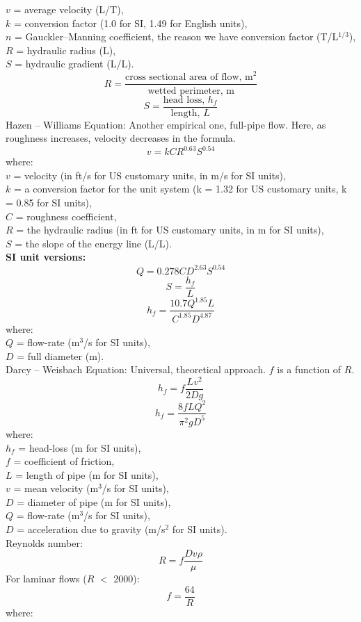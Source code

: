 \documentclass{article}
\numberwithin{equation}{section}
\begin{document}
$v$ = average velocity (L/T),\\
$k$ = conversion factor (1.0 for SI, 1.49 for English units),\\
$n$ = Gauckler–Manning coefficient, the reason we have conversion factor (T/L$^{1/3}$),\\
$R$ = hydraulic radius (L),\\
$S$ = hydraulic gradient (L/L).
\[
R = \frac{\text{cross sectional area of flow, m}^2}{\text{wetted perimeter, m}}
\]
\[
S = \frac{\text{head loss, }h_f}{\text{length, }L}
\]
Hazen -- Williams Equation: Another empirical one, full-pipe flow. Here, as roughness increases, velocity decreases in the formula.
\[
v = kCR^{0.63}S^{0.54}
\]
where:\\
$v$ = velocity (in ft/s for US customary units, in m/s for SI units),\\
$k$ = a conversion factor for the unit system (k = 1.32 for US customary units, k = 0.85 for SI units),\\
$C$ = roughness coefficient,\\
$R$ = the hydraulic radius (in ft for US customary units, in m for SI units),\\
$S$ = the slope of the energy line (L/L).\\
\textbf{SI unit versions:} %
\[
Q = 0.278CD^{2.63}S^{0.54}
\]
\[
S = \frac{h_f}{L}
\]
\[
h_f = \frac{10.7Q^{1.85}L}{C^{1.85}D^{4.87}}
\]
where:\\
$Q$ = flow-rate (m$^3$/s for SI units),\\
$D$ = full diameter (m).\\
Darcy -- Weisbach Equation: Universal, theoretical approach. $f$ is a function of $R$.
\[
h_f = f\frac{Lv^2}{2Dg}
\]
\[
h_f = \frac{8fLQ^2}{\pi^2gD^5}
\]
where:\\
$h_f$ = head-loss (m for SI units),\\
$f$ = coefficient of friction,\\
$L$ = length of pipe (m for SI units),\\
$v$ = mean velocity (m$^3$/s for SI units),\\
$D$ = diameter of pipe (m for SI units),\\
$Q$ = flow-rate (m$^3$/s for SI units),\\
$D$ = acceleration due to gravity (m/s$^2$ for SI units).\\
Reynolds number:
\[
R = f\frac{Dv\rho}{\mu}
\]
For laminar flows ($R$ $<$ 2000):
\[
f = \frac{64}{R}
\]
where:\\
\end{document}
